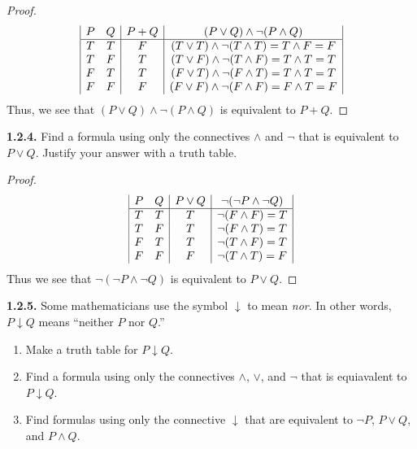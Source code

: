 \documentclass[12pt]{amsart}
\newenvironment{statement}[1]{\smallskip\noindent\color[rgb]{.6627, .3529, .6314} {\bf #1.}}{}
\theoremstyle{definition}
\theoremstyle{remark}
\begin{document}
\begin{proof}
\begin{equation*}
	\begin{array}{| c c | c | c |}
		P & Q & P + Q & (P \vee Q) \wedge \neg (P \wedge Q) \\
		\hline
		T & T & F & (T \vee T) \wedge \neg (T \wedge T) = T \wedge F = F \\
		T & F & T & (T \vee F) \wedge \neg (T \wedge F) = T \wedge T = T \\
		F & T & T & (F \vee T) \wedge \neg (F \wedge T) = T \wedge T = T \\
		F & F & F & (F \vee F) \wedge \neg (F \wedge F) = F \wedge T = F
	\end{array}
\end{equation*}
Thus, we see that $(P \vee Q) \wedge \neg (P \wedge Q)$ is equivalent to $P + Q$.
\end{proof}


\begin{statement}{1.2.4}
Find a formula using only the connectives $\wedge$ and $\neg$ that is equivalent to $P \vee Q$.
Justify your answer with a truth table.
\end{statement}

\begin{proof}
\begin{equation*}
	\begin{array}{| c c | c | c |}
		P & Q & P \vee Q & \neg (\neg P \wedge \neg Q) \\
		\hline
		T & T & T & \neg (F \wedge F) = T \\
		T & F & T & \neg (F \wedge T) = T \\
		F & T & T & \neg (T \wedge F) = T \\
		F & F & F & \neg (T \wedge T) = F
	\end{array}
\end{equation*}
Thus we see that $\neg (\neg P \wedge \neg Q)$ is equivalent to $P \vee Q$.
\end{proof}


\begin{statement}{1.2.5}
Some mathematicians use the symbol $\downarrow$ to mean \emph{nor}.
In other words, $P \downarrow Q$ means ``neither $P$ nor $Q$.''
\begin{enumerate}
	\item Make a truth table for $P \downarrow Q$.
	\item Find a formula using only the connectives $\wedge$, $\vee$, and $\neg$ that is equiavalent to $P \downarrow Q$.
	\item Find formulas using only the connective $\downarrow$ that are equivalent to $\neg P$, $P \vee Q$, and $P \wedge Q$.
\end{enumerate}
\end{statement}
\end{document}
